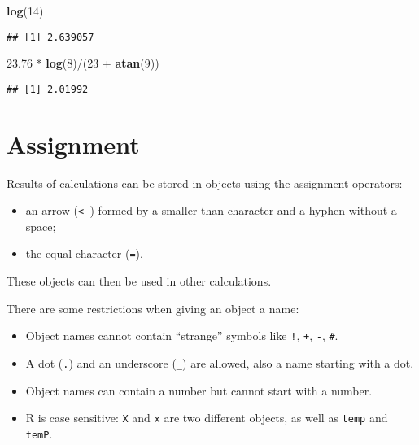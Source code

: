 \documentclass[]{book}
\newenvironment{Shaded}{\begin{snugshade}}{\end{snugshade}}
\newcommand{\KeywordTok}[1]{\textcolor[rgb]{0.13,0.29,0.53}{\textbf{{#1}}}}
\newcommand{\DecValTok}[1]{\textcolor[rgb]{0.00,0.00,0.81}{{#1}}}
\newcommand{\FloatTok}[1]{\textcolor[rgb]{0.00,0.00,0.81}{{#1}}}
\newcommand{\StringTok}[1]{\textcolor[rgb]{0.31,0.60,0.02}{{#1}}}
\newcommand{\NormalTok}[1]{{#1}}
\providecommand{\tightlist}{%
  \setlength{\itemsep}{0pt}\setlength{\parskip}{0pt}}
\def\tightlist{}
\begin{document}
\begin{Shaded}
\begin{Highlighting}[]
\KeywordTok{log}\NormalTok{(}\DecValTok{14}\NormalTok{)}
\end{Highlighting}
\end{Shaded}

\begin{verbatim}
## [1] 2.639057
\end{verbatim}

\begin{Shaded}
\begin{Highlighting}[]
\FloatTok{23.76} \NormalTok{*}\StringTok{ }\KeywordTok{log}\NormalTok{(}\DecValTok{8}\NormalTok{)/(}\DecValTok{23} \NormalTok{+}\StringTok{ }\KeywordTok{atan}\NormalTok{(}\DecValTok{9}\NormalTok{))}
\end{Highlighting}
\end{Shaded}

\begin{verbatim}
## [1] 2.01992
\end{verbatim}

\section{Assignment}\label{assignment}

Results of calculations can be stored in objects using the assignment
operators:

\begin{itemize}
\tightlist
\item
  an arrow (\texttt{\textless{}-}) formed by a smaller than character
  and a hyphen without a space;
\item
  the equal character (\texttt{=}).
\end{itemize}

These objects can then be used in other calculations.

There are some restrictions when giving an object a name:

\begin{itemize}
\tightlist
\item
  Object names cannot contain ``strange'' symbols like \texttt{!},
  \texttt{+}, \texttt{-}, \texttt{\#}.
\item
  A dot (\texttt{.}) and an underscore (\texttt{\_}) are allowed, also a
  name starting with a dot.
\item
  Object names can contain a number but cannot start with a number.
\item
  R is case sensitive: \texttt{X} and \texttt{x} are two different
  objects, as well as \texttt{temp} and \texttt{temP}.
\end{itemize}
\end{document}
